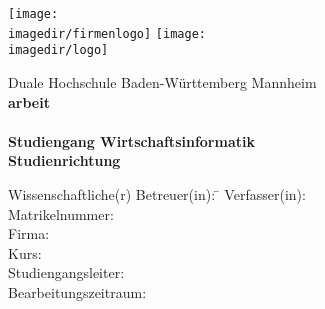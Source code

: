 \begin{titlepage}
	\begin{minipage}{\textwidth}
		\vspace{-2cm}
		\texttt{[image: \\imagedir/firmenlogo]} \hfill \texttt{[image: \\imagedir/logo]}
	\end{minipage}
	\vspace{1em}
	\begin{center}
	{\textsf{\large Duale Hochschule Baden-Württemberg Mannheim}}\\[4em]
	{\textsf{\textbf{\large{\DieArtDerArbeit}arbeit}}}\\[6mm]
	{\textsf{\textbf{\Large{}\DerTitelDerArbeit}}} \\[1.5cm]
	{\textsf{\textbf{\large{}Studiengang Wirtschaftsinformatik}}\\[6mm]
	\textsf{\textbf{Studienrichtung \DieStudienrichtung}}}\vspace{10em}

	\begin{minipage}{\textwidth}
		\begin{tabbing}
			Wissenschaftliche(r) Betreuer(in): \hspace{0.85cm}\=\kill
			Verfasser(in): \> \DerAutorDerArbeit \\[1.5mm]
			Matrikelnummer: \> \DieMatrikelnummer \\[1.5mm]
			Firma: \> \DerNameDerFirma  \\[1.5mm]
			Kurs: \> \DieKursbezeichnung \\[1.5mm]
			Studiengangsleiter: \> \DerStudiengangsleiter \\[1.5mm]
			Bearbeitungszeitraum: \> \DerBearbeitungszeitraum\\[1.5mm]
		\end{tabbing}
	\end{minipage}
	\end{center}
\end{titlepage}